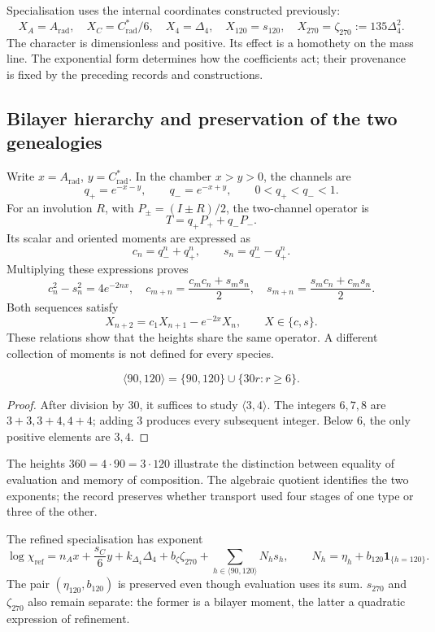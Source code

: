 Specialisation uses the internal coordinates constructed previously:
\[
 X_A=A_{\mathrm{rad}},\quad X_C=C^*_{\mathrm{rad}}/6,
 \quad X_4=\Delta_4,\quad X_{120}=s_{120},\quad
 X_{270}=\zeta_{270}:=135\Delta_4^2.
\]
The character is dimensionless and positive. Its effect is a homothety on
the mass line. The exponential form determines how the
coefficients act; their provenance is fixed by the preceding records and
constructions.

\subsection{Bilayer hierarchy and preservation of the two genealogies}

Write \(x=A_{\mathrm{rad}}\), \(y=C^*_{\mathrm{rad}}\). In the
chamber \(x>y>0\), the channels are
\[
 q_+=e^{-x-y},\qquad q_-=e^{-x+y},\qquad0<q_+<q_-<1.
\]
For an involution \(R\), with \(P_\pm=(I\pm R)/2\), the
two-channel operator is
\[
 T=q_+P_++q_-P_-.
\]
Its scalar and oriented moments are expressed as
\[
 c_n=q_-^n+q_+^n,\qquad s_n=q_-^n-q_+^n.
\]
Multiplying these expressions proves
\[
 c_n^2-s_n^2=4e^{-2nx},\quad
 c_{m+n}=\frac{c_mc_n+s_ms_n}{2},\quad
 s_{m+n}=\frac{s_mc_n+c_ms_n}{2}.
\]
Both sequences satisfy
\[
 X_{n+2}=c_1X_{n+1}-e^{-2x}X_n,\qquad X\in\{c,s\}.
\]
These relations show that the heights share the same operator.
A different collection of moments is not defined for every species.

\begin{proposition}
\[
 \langle90,120\rangle=\{90,120\}\cup\{30r:r\ge6\}.
\]
\end{proposition}
\begin{proof}
After division by \(30\), it suffices to study \(\langle3,4\rangle\).
The integers \(6,7,8\) are \(3+3,3+4,4+4\); adding \(3\) produces
every subsequent integer. Below \(6\), the only positive
elements are \(3,4\).
\end{proof}

The heights \(360=4\cdot90=3\cdot120\) illustrate the distinction between
equality of evaluation and memory of composition. The algebraic quotient
identifies the two exponents; the record preserves whether transport
used four stages of one type or three of the other.

The refined specialisation has exponent
\[
 \log\chi_{\mathrm{ref}}=n_Ax+\frac{s_C}{6}y+k_{\Delta_4}\Delta_4
 +b_{\zeta}\zeta_{270}+\sum_{h\in\langle90,120\rangle}N_hs_h,
 \qquad N_h=\eta_h+b_{120}\mathbf1_{\{h=120\}}.
\]
The pair \((\eta_{120},b_{120})\) is preserved even though evaluation uses
its sum. \(s_{270}\) and \(\zeta_{270}\) also remain
separate: the former is a bilayer moment, the latter a
quadratic expression of refinement.

